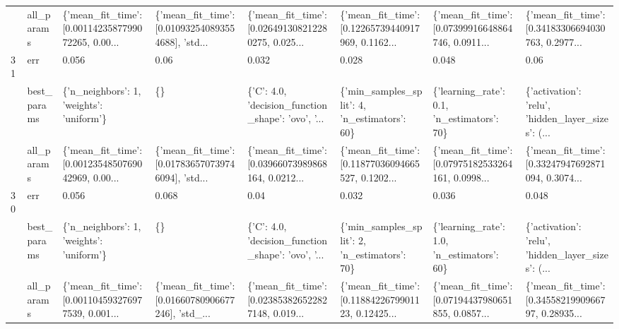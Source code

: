 \begin{tabular}{llllllll}
   & all\_params &  \{'mean\_fit\_time': [0.0011423587799072265, 0.00... &  \{'mean\_fit\_time': [0.010932540893554688], 'std... &  \{'mean\_fit\_time': [0.026491308212280275, 0.025... &  \{'mean\_fit\_time': [0.12265739440917969, 0.1162... &  \{'mean\_fit\_time': [0.07399916648864746, 0.0911... &  \{'mean\_fit\_time': [0.34183306694030763, 0.2977... \\
31 & err &                                              0.056 &                                               0.06 &                                              0.032 &                                              0.028 &                                              0.048 &                                               0.06 \\
   & best\_params &           \{'n\_neighbors': 1, 'weights': 'uniform'\} &                                                 \{\} &  \{'C': 4.0, 'decision\_function\_shape': 'ovo', '... &       \{'min\_samples\_split': 4, 'n\_estimators': 60\} &         \{'learning\_rate': 0.1, 'n\_estimators': 70\} &  \{'activation': 'relu', 'hidden\_layer\_sizes': (... \\
   & all\_params &  \{'mean\_fit\_time': [0.0012354850769042969, 0.00... &  \{'mean\_fit\_time': [0.017836570739746094], 'std... &  \{'mean\_fit\_time': [0.03966073989868164, 0.0212... &  \{'mean\_fit\_time': [0.11877036094665527, 0.1202... &  \{'mean\_fit\_time': [0.07975182533264161, 0.0998... &  \{'mean\_fit\_time': [0.33247947692871094, 0.3074... \\
30 & err &                                              0.056 &                                              0.068 &                                               0.04 &                                              0.032 &                                              0.036 &                                              0.048 \\
   & best\_params &           \{'n\_neighbors': 1, 'weights': 'uniform'\} &                                                 \{\} &  \{'C': 4.0, 'decision\_function\_shape': 'ovo', '... &       \{'min\_samples\_split': 2, 'n\_estimators': 70\} &         \{'learning\_rate': 1.0, 'n\_estimators': 60\} &  \{'activation': 'relu', 'hidden\_layer\_sizes': (... \\
   & all\_params &  \{'mean\_fit\_time': [0.001104593276977539, 0.001... &  \{'mean\_fit\_time': [0.01660780906677246], 'std\_... &  \{'mean\_fit\_time': [0.023853826522827148, 0.019... &  \{'mean\_fit\_time': [0.1188422679901123, 0.12425... &  \{'mean\_fit\_time': [0.07194437980651855, 0.0857... &  \{'mean\_fit\_time': [0.3455821990966797, 0.28935... \\
\bottomrule
\end{tabular}
